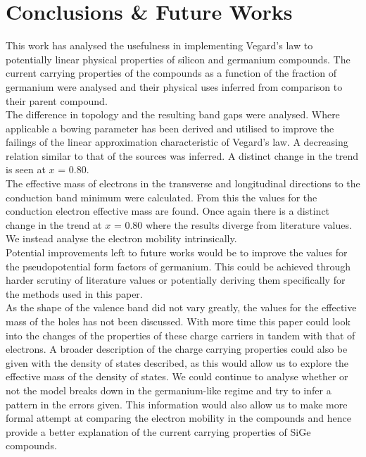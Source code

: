 \documentclass[10pt, twocolumn]{revtex4}    %
\begin{document}
\section{Conclusions \& Future Works}

This work has analysed the usefulness in implementing Vegard's law to potentially linear physical properties of silicon and germanium compounds. The current carrying properties of the compounds as a function of the fraction of germanium were analysed and their physical uses inferred from comparison to their parent compound.\\

The difference in topology and the resulting band gaps were analysed. Where applicable a bowing parameter has been derived and utilised to improve the failings of the linear approximation characteristic of Vegard's law. A decreasing relation similar to that of the sources was inferred. A distinct change in the trend is seen at $x$ = 0.80. \\

The effective mass of electrons in the transverse and longitudinal directions to the conduction band minimum were calculated. From this the values for the conduction electron effective mass are found.  Once again there is a distinct change in the trend at $x$ = 0.80 where the results diverge from literature values. We instead analyse the electron mobility intrinsically.\\

Potential improvements left to future works would be to improve the values for the pseudopotential form factors of germanium. This could be achieved through harder scrutiny of literature values or potentially deriving them specifically for the methods used in this paper.\\

As the shape of the valence band did not vary greatly, the values for the effective mass of the holes has not been discussed. With more time this paper could look into the changes of the properties of these charge carriers in tandem with that of electrons. A broader description of the charge carrying properties could also be given with the density of states described, as this would allow us to explore the effective mass of the density of states. We could continue to analyse whether or not the model breaks down in the germanium-like regime and try to infer a pattern in the errors given. This information would also allow us to make more formal attempt at comparing the electron mobility in the compounds and hence provide a better explanation of the current carrying properties of SiGe compounds.
\end{document}
